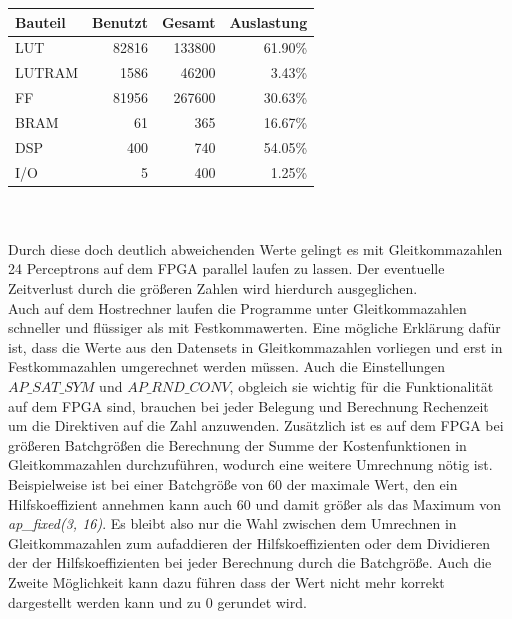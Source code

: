 \begin{tabularx}{.6\textwidth}{p{}|r|r|r}
Bauteil & Benutzt & Gesamt & Auslastung \\
\hline
LUT & 82816 & 133800 & 61.90\%\\
\hline
LUTRAM & 1586 & 46200 & 3.43\%\\
\hline
FF & 81956 & 267600 & 30.63\%\\
\hline
BRAM & 61 & 365 & 16.67\%\\
\hline
DSP & 400 & 740 & 54.05\%\\
\hline
I/O & 5 & 400 & 1.25\%\\
\end{tabularx}\\\\

Durch diese doch deutlich abweichenden Werte gelingt es mit Gleitkommazahlen 24 Perceptrons auf dem FPGA parallel laufen zu lassen.
Der eventuelle Zeitverlust durch die größeren Zahlen wird hierdurch ausgeglichen. \\ 
Auch auf dem Hostrechner laufen die Programme unter Gleitkommazahlen schneller und flüssiger als mit Festkommawerten. Eine mögliche Erklärung dafür ist, dass die Werte aus den Datensets in Gleitkommazahlen vorliegen und erst in Festkommazahlen umgerechnet werden müssen. Auch die Einstellungen $AP\_SAT\_SYM$ und $AP\_RND\_CONV$, obgleich sie wichtig für die Funktionalität auf dem FPGA sind, brauchen bei jeder Belegung und Berechnung Rechenzeit um die Direktiven auf die Zahl anzuwenden. Zusätzlich ist es auf dem FPGA bei größeren Batchgrößen die Berechnung der Summe der Kostenfunktionen in Gleitkommazahlen durchzuführen, wodurch eine weitere Umrechnung nötig ist. Beispielweise ist bei einer Batchgröße von 60 der maximale Wert, den ein Hilfskoeffizient annehmen kann auch 60 und damit größer als das Maximum von \textit{ap\_fixed(3, 16)}. Es bleibt also nur die Wahl zwischen dem Umrechnen in Gleitkommazahlen zum aufaddieren der Hilfskoeffizienten oder dem Dividieren der der Hilfskoeffizienten bei jeder Berechnung durch die Batchgröße. Auch die Zweite Möglichkeit kann dazu führen dass der Wert nicht mehr korrekt dargestellt werden kann und zu 0 gerundet wird. 